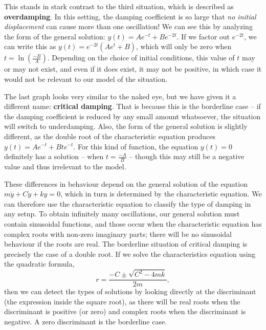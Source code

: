 \documentclass[12pt,letterpaper,twoside]{amsart}
\begin{document}
This stands in stark contrast to the third situation, which is described as {\bf overdamping}.  In this setting, the damping coefficient is so large that {\it no initial displacement} can cause more than one oscillation!  We can see this by analyzing the form of the general solution: $y(t) = A e^{-t}+Be^{-2t}$.  If we factor out $e^{-2t}$, we can write this as $y(t)=e^{-2t}(Ae^t+B)$, which will only be zero when $t=\ln \left(\frac{-B}{A} \right)$.  Depending on the choice of initial conditions, this value of $t$ may or may not exist, and even if it does exist, it may not be positive, in which case it would not be relevant to our model of the situation.

The last graph looks very similar to the naked eye, but we have given it a different name: {\bf critical damping}.  That is because this is the borderline case -- if the damping coefficient is reduced by any small amount whatsoever, the situation will switch to underdamping.  Also, the form of the general solution is slightly different, as the double root of the characteristic equation produces $y(t)=Ae^{-t}+Bte^{-t}$.  For this kind of function, the equation $y(t)=0$ definitely has a solution -- when $t=\frac{-A}{B}$ -- though this may still be a negative value and thus irrelevant to the model.

These differences in behaviour depend on the general solution of the equation $m\ddot{y}+C \dot{y} + ky =0$, which in turn is determined by the characteristic equation.  We can therefore use the characteristic equation to classify the type of damping in any setup.  To obtain infinitely many oscillations, our general solution must contain sinusoidal functions, and those occur when the characteristic equation has complex roots with non-zero imaginary parts; there will be no sinusoidal behaviour if the roots are real.  The borderline situation of critical damping is precisely the case of a double root.  If we solve the characteristics equation using the quadratic formula, 
\[ r = \frac{-C \pm \sqrt{C^2-4mk}}{2m},\]
then we can detect the types of solutions by looking directly at the discriminant (the expression inside the square root), as there will be real roots when the discriminant is positive (or zero) and complex roots when the discriminant is negative.  A zero discriminant is the borderline case.

\begin{center}
\end{center}
\end{document}
